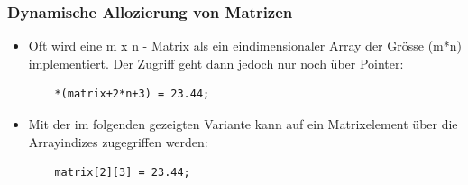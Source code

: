 \subsubsection{Dynamische Allozierung von Matrizen}
\label{sec:Dynamische Allozierung von Matrizen}
\begin{itemize}
	\item Oft wird eine m x n - Matrix als ein eindimensionaler Array der Grösse (m*n) implementiert. Der Zugriff geht dann jedoch nur noch über Pointer:
	\noindent
	\begin{minipage}{\linewidth}
	\begin{lstlisting}
	*(matrix+2*n+3) = 23.44;
	\end{lstlisting}
	\end{minipage}
	\item Mit der im folgenden gezeigten Variante kann auf ein Matrixelement über die Arrayindizes zugegriffen werden:
	\begin{minipage}{\linewidth}
	\begin{lstlisting}
	matrix[2][3] = 23.44;
	\end{lstlisting}
	\end{minipage}
\end{itemize}

